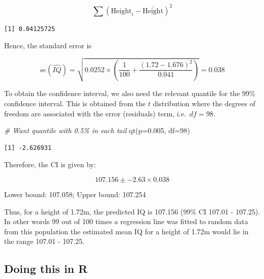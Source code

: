 \documentclass[
  oneside]{krantz}
\newenvironment{Shaded}{\begin{snugshade}}{\end{snugshade}}
\newcommand{\AttributeTok}[1]{\textcolor[rgb]{0.77,0.63,0.00}{#1}}
\newcommand{\CommentTok}[1]{\textcolor[rgb]{0.56,0.35,0.01}{\textit{#1}}}
\newcommand{\DecValTok}[1]{\textcolor[rgb]{0.00,0.00,0.81}{#1}}
\newcommand{\FloatTok}[1]{\textcolor[rgb]{0.00,0.00,0.81}{#1}}
\newcommand{\FunctionTok}[1]{\textcolor[rgb]{0.00,0.00,0.00}{#1}}
\newcommand{\NormalTok}[1]{#1}
\newcommand{\SpecialCharTok}[1]{\textcolor[rgb]{0.00,0.00,0.00}{#1}}
\begin{document}
\[\sum{(\mathrm{Height}_i-\bar{\mathrm{Height}})^2} \]

\begin{Shaded}
\end{Shaded}

\begin{verbatim}
[1] 0.04125725
\end{verbatim}

Hence, the standard error is

\[se(\hat{IQ})=\sqrt{0.0252\times (\frac{1}{100}+\frac{(1.72-1.676)^2}{0.041})} =0.038\]

To obtain the confidence interval, we also need the relevant quantile for the 99\% confidence interval. This is obtained from the \(t\) distribution where the degrees of freedom are associated with the error (residuals) term, i.e.~\(df=98\).

\begin{Shaded}
\begin{Highlighting}[]
\CommentTok{\# Want quantile with 0.5\% in each tail}
\FunctionTok{qt}\NormalTok{(}\AttributeTok{p=}\FloatTok{0.005}\NormalTok{, }\AttributeTok{df=}\DecValTok{98}\NormalTok{)}
\end{Highlighting}
\end{Shaded}

\begin{verbatim}
[1] -2.626931
\end{verbatim}

Therefore, the CI is given by:

\[107.156 \pm -2.63\times 0.038\]

Lower bound: 107.058; Upper bound: 107.254

Thus, for a height of 1.72m, the predicted IQ is 107.156 (99\% CI 107.01 - 107.25). In other words 99 out of 100 times a regression line was fitted to random data from this population the estimated mean IQ for a height of 1.72m would lie in the range 107.01 - 107.25.

\hypertarget{doing-this-in-r-28}{%
\subsection{Doing this in R}\label{doing-this-in-r-28}}
\end{document}
